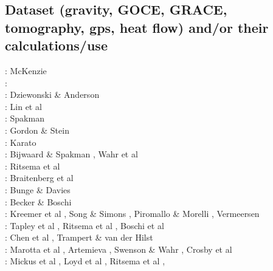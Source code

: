 \subsection{Dataset (gravity, GOCE, GRACE, tomography, gps, heat flow) 
and/or their calculations/use}

\begin{scriptsize}
\nineteensixtyseven: McKenzie \cite{mcke67}\\
\nineteenseventyseven: \cite{rola77}\\
\nineteeneightyone: Dziewonski \& Anderson \cite{dzan81}\\
\nineteenninety: Lin et al \cite{lips90}\\
\nineteenninetyone: Spakman \cite{spak91}\\
\nineteenninetytwo: Gordon \& Stein \cite{gost92}\\
\nineteenninetythree: Karato \cite{kara93}\\
\nineteenninetyeight: Bijwaard \& Spakman \cite{bisp98}, Wahr et al \cite{wamb98}\\
\nineteenninetynine: Ritsema et al \cite{rivw99}\\
\twothousand: Braitenberg et al \cite{brzf00}\\
\twothousandone: Bunge \& Davies \cite{buda01}\\
\twothousandtwo: Becker \& Boschi \cite{bebo02}\\
\twothousandthree: Kreemer et al \cite{krhh03}, Song \& Simons \cite{sosi03}, 
Piromallo \& Morelli \cite{pimo03}, Vermeersen \cite{verm03}\\
\twothousandfour: Tapley et al \cite{tabr04}, Ritsema et al \cite{rivw04}, Boschi et al \cite{boek04}\\
\twothousandfive: Chen et al \cite{chrw05}, Trampert \& van der Hilst \cite{trva05}\\
\twothousandsix: Marotta et al \cite{masr06}, Artemieva \cite{arte06}, Swenson \& Wahr \cite{swwa06}, Crosby et al \cite{crms06}\\
\twothousandseven: Mickus et al \cite{mitk07}, Loyd et al \cite{lobc07}, Ritsema et al \cite{rimb07}, 

\end{scriptsize}
